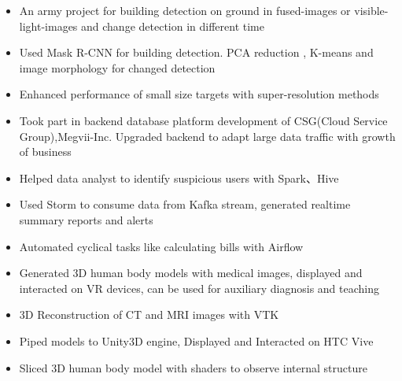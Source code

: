 \documentclass{resume}
\begin{document}
\begin{itemize}[topsep = 0 pt, partopsep = 0pt]
  \item An army project for building detection on ground in fused-images or visible-light-images and change detection in different time
  \item Used Mask R-CNN for building detection. PCA reduction , K-means and image morphology for changed detection
  \item Enhanced performance of small size targets with super-resolution methods 
\end{itemize}

\begin{itemize}[topsep = 0 pt, partopsep = 0pt]
  \item Took part in backend database platform development of CSG(Cloud Service Group),Megvii-Inc. Upgraded backend to adapt large data traffic with growth of business
  \item Helped data analyst to identify suspicious users with Spark、Hive
  \item Used Storm to consume data from Kafka stream, generated realtime summary reports and alerts
  \item Automated cyclical tasks like calculating bills with Airflow 
\end{itemize}

\begin{itemize}[topsep = 0 pt, partopsep = 0pt]
  \item Generated 3D human body models with medical images, displayed and interacted on VR devices, can be used for auxiliary diagnosis and teaching
  \item 3D Reconstruction of CT and MRI images with VTK
  \item Piped models to Unity3D engine, Displayed and Interacted on HTC Vive
  \item Sliced 3D human body model with shaders to observe internal structure
\end{itemize}
\end{document}
